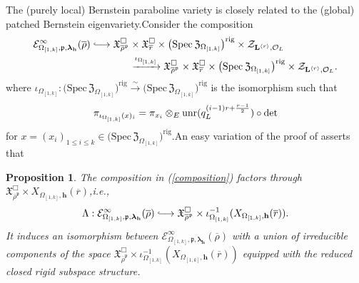 \documentclass[SecEq,CM,GP]{degruyter-crelle} %
\theoremstyle{plain}
\newtheorem{pro}[thm]{Proposition}
\newtheorem{rmk}[thm]{Remark}
\newcommand{\hooklongrightarrow}{\lhook\joinrel\longrightarrow}
\newcommand{\ana}{{\rm an}}
\newcommand{\bersteineigenvarpik}{{\mathcal{E}_{\omepik,\fp,\bm{\lambda}_\bh}^\infty(\overline{\rho})}}
\newcommand{\defvar}{{ X_{\omepik,\mathbf{{h}}}(\overline{r})}}
\newcommand{\defvarrho}{{ X_{\omepik,\mathbf{{h}}}(\overline{r})}}
\newcommand{\lrr}{{\langle r\rangle}}
\newcommand{\omepik}{\Omega_{[1,k]}}
\newcommand{\rigch}{{\mathcal{Z}_{\bL^{\lrr},\mathcal{O}_L}}}
\newcommand{\sbanpik}{{\big(\mathrm{Spec}\hspace{2pt}\mathfrak{Z}_{\omepik}\big)^{\mathrm{rig}}}}
\newcommand{\unr}{{\rm unr}}
\newcommand{\bL}{{\mathbf{L}}}
\newcommand{\bh}{{\mathbf{h}}}
\newcommand{\FX}{{\mathfrak{X}}}
\newcommand{\fp}{{\mathfrak{p}}}
\begin{document}
The (purely local) Bernstein paraboline variety is  closely related to the (global) patched Bernstein eigenvariety.\;Consider the composition
\begin{equation}\label{composition}
\begin{aligned}
	\bersteineigenvarpik\hooklongrightarrow \FX_{\overline{\rho}^{\fp}}^\Box&\times \mathfrak{X}_{\overline{r}}^\Box \times \sbanpik\times \rigch\\
	&\xrightarrow{\iota_{\omepik}} \FX_{\overline{\rho}^{\fp}}^\Box\times \mathfrak{X}_{\overline{r}}^\Box \times \sbanpik\times \rigch.
\end{aligned}
\end{equation}
where $\iota_{\omepik}:\sbanpik\xrightarrow{\sim}\sbanpik$ is the isomorphism such that \[\pi_{\iota_{\omepik}(x)_i}=\pi_{x_i}\otimes_E\unr(q_L^{(i-1)r+\frac{r-1}{2}})\circ\det\] for $x=(x_i)_{1\leq i\leq k}\in \sbanpik$.\;An easy variation of the proof of \cite[Theorem 3.3.9]{Ding2021} asserts that
\begin{pro}\label{linkingpatched}The composition in (\ref{composition}) factors through $\FX_{\overline{\rho}^{\fp}}^\Box\times \defvarrho$,\;i.e.,\;
\begin{equation}\label{mapbersteineigenvarpikdefvarrho}
	\Lambda:\bersteineigenvarpik\hooklongrightarrow \FX_{\overline{\rho}^{\fp}}^\Box\times \iota_{\omepik}^{-1}(\defvar).
\end{equation}	
It induces an isomorphism between $\bersteineigenvarpik$ with a union of irreducible components of the space $\FX_{\overline{\rho}^{\fp}}^\Box\times \iota_{\omepik}^{-1}(\defvar)$ equipped with the reduced closed rigid subspace structure.\;
\end{pro}
\end{document}
